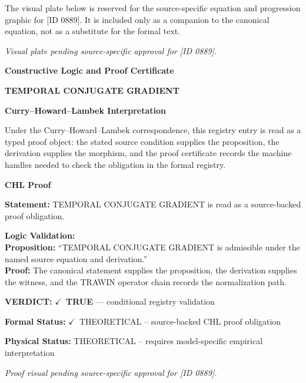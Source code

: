 \begingroup\footnotesize\sloppy
The visual plate below is reserved for the source-specific equation and progression graphic for [ID 0889]. It is included only as a companion to the canonical equation, not as a substitute for the formal text.
\par\endgroup
\begingroup\footnotesize\itshape
Visual plate pending source-specific approval for [ID 0889].
\par\endgroup

\clearpage
\begingroup\tzpsupportsetup
\noindent\textbf{\fontsize{10.8pt}{12.8pt}\selectfont [ID 0889] Constructive Logic and Proof Certificate}\par
\noindent\textbf{\fontsize{10pt}{12pt}\selectfont TEMPORAL CONJUGATE GRADIENT}\par
\vspace{0.45em}
\begingroup
\footnotesize
\setlength{\parskip}{0.22em}
\setlength{\parindent}{0pt}
\noindent\textbf{Curry--Howard--Lambek Interpretation}\par
Under the Curry--Howard--Lambek correspondence, this registry entry is read as a typed proof
object: the stated source condition supplies the proposition, the derivation supplies the
morphism, and the proof certificate records the machine handles needed to check the obligation
in the formal registry.

\vspace{0.45em}
\noindent\textbf{CHL Proof}\par
\textbf{Statement:} TEMPORAL CONJUGATE GRADIENT is read as a source-backed proof obligation.

\textbf{Logic Validation:}\\
\textbf{Proposition:} ``TEMPORAL CONJUGATE GRADIENT is admissible under the named source equation and derivation.''\\
\textbf{Proof:} The canonical statement supplies the proposition, the derivation supplies the witness, and the TRAWIN operator chain records the normalization path.

\textbf{VERDICT:} \ensuremath{\checkmark}\ \textbf{TRUE} --- conditional registry validation

\textbf{Formal Status:} \ensuremath{\checkmark}\ THEORETICAL -- source-backed CHL proof obligation

\textbf{Physical Status:} THEORETICAL -- requires model-specific empirical interpretation
\par\vspace{0.45em}
\par
\vfill
\begingroup\footnotesize\itshape
Proof visual pending source-specific approval for [ID 0889].
\par\endgroup
\vfill
\endgroup
\endgroup
